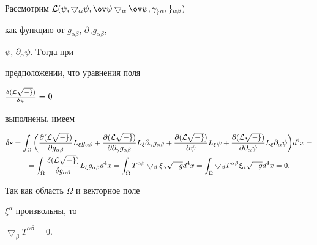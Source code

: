 \begin{pf}


Рассмотрим $\cal L(\psi,\bigtriangledown_\alpha\psi, \ov\psi


\bigtriangledown_\alpha\ov\psi, \gamma_{g\alpha}, g_{\alpha\beta})$ 


как функцию от $g_{\alpha\beta}$, $\partial_\gamma g_{\alpha\beta}$,


$\psi $, $\partial_\alpha\psi$. Tогда при


предположении, что уравнения поля


$\frac{\delta( \cal L\sqrt{-g})}{\delta \psi}=0$


выполнены, имеем


\begin{multline*}


\delta s= \int_\Omega\bigg(


\frac{\partial ( \cal L\sqrt{-g})}{\partial g_{\alpha\beta}}L_\xi


g_{\alpha\beta}+


\frac{\partial ( \cal L\sqrt{-g})}{\partial \partial_\gamma


g_{\alpha\beta}}L_\xi\partial_\gamma g_{\alpha\beta}+


\frac{\partial ( \cal L\sqrt{-g})}{\partial \psi}L_\xi\psi+


\frac{\partial ( \cal L\sqrt{-g})}{\partial \partial_\alpha\psi}


L_\xi\partial_\alpha\psi\bigg)d^4x= \\


%


=\int_\Omega\frac{\delta( \cal L\sqrt{-g})}{\delta g_{\alpha\beta}}


L_\xi g_{\alpha\beta}d^4x=\int_\Omega T^{\alpha\beta}


\bigtriangledown_\beta\xi_\alpha\sqrt{-g}d^4x= 


\int_\Omega\bigtriangledown_\beta T^{\alpha\beta}\xi_\alpha


\sqrt{-g}d^4x=0.


\end{multline*}


Так как область $\Omega$ и векторное поле


$\xi^\alpha $ произвольны, то


$\bigtriangledown_\beta T^{\alpha\beta}=0$.


\end{pf}





